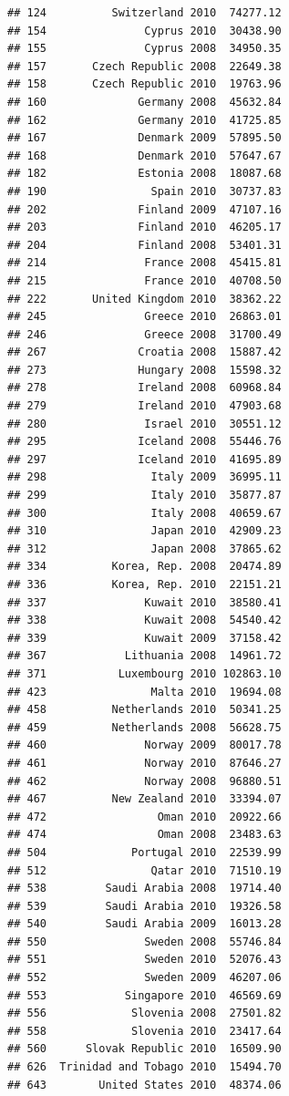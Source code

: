 \documentclass{article}\usepackage[]{graphicx}\usepackage[]{color}
\makeatletter
\newenvironment{kframe}{%
 \def\at@end@of@kframe{}%
 \ifinner\ifhmode%
  \def\at@end@of@kframe{\end{minipage}}%
  \begin{minipage}{\columnwidth}%
 \fi\fi%
 \def\FrameCommand##1{\hskip\@totalleftmargin \hskip-\fboxsep
 \colorbox{shadecolor}{##1}\hskip-\fboxsep
     \hskip-\linewidth \hskip-\@totalleftmargin \hskip\columnwidth}%
 \MakeFramed {\advance\hsize-\width
   \@totalleftmargin\z@ \linewidth\hsize
   \@setminipage}}%
 {\par\unskip\endMakeFramed%
 \at@end@of@kframe}
\newenvironment{knitrout}{}{} %
\makeatother
\begin{document}
\begin{knitrout}
\begin{kframe}
\begin{verbatim}
## 124          Switzerland 2010  74277.12
## 154               Cyprus 2010  30438.90
## 155               Cyprus 2008  34950.35
## 157       Czech Republic 2008  22649.38
## 158       Czech Republic 2010  19763.96
## 160              Germany 2008  45632.84
## 162              Germany 2010  41725.85
## 167              Denmark 2009  57895.50
## 168              Denmark 2010  57647.67
## 182              Estonia 2008  18087.68
## 190                Spain 2010  30737.83
## 202              Finland 2009  47107.16
## 203              Finland 2010  46205.17
## 204              Finland 2008  53401.31
## 214               France 2008  45415.81
## 215               France 2010  40708.50
## 222       United Kingdom 2010  38362.22
## 245               Greece 2010  26863.01
## 246               Greece 2008  31700.49
## 267              Croatia 2008  15887.42
## 273              Hungary 2008  15598.32
## 278              Ireland 2008  60968.84
## 279              Ireland 2010  47903.68
## 280               Israel 2010  30551.12
## 295              Iceland 2008  55446.76
## 297              Iceland 2010  41695.89
## 298                Italy 2009  36995.11
## 299                Italy 2010  35877.87
## 300                Italy 2008  40659.67
## 310                Japan 2010  42909.23
## 312                Japan 2008  37865.62
## 334          Korea, Rep. 2008  20474.89
## 336          Korea, Rep. 2010  22151.21
## 337               Kuwait 2010  38580.41
## 338               Kuwait 2008  54540.42
## 339               Kuwait 2009  37158.42
## 367            Lithuania 2008  14961.72
## 371           Luxembourg 2010 102863.10
## 423                Malta 2010  19694.08
## 458          Netherlands 2010  50341.25
## 459          Netherlands 2008  56628.75
## 460               Norway 2009  80017.78
## 461               Norway 2010  87646.27
## 462               Norway 2008  96880.51
## 467          New Zealand 2010  33394.07
## 472                 Oman 2010  20922.66
## 474                 Oman 2008  23483.63
## 504             Portugal 2010  22539.99
## 512                Qatar 2010  71510.19
## 538         Saudi Arabia 2008  19714.40
## 539         Saudi Arabia 2010  19326.58
## 540         Saudi Arabia 2009  16013.28
## 550               Sweden 2008  55746.84
## 551               Sweden 2010  52076.43
## 552               Sweden 2009  46207.06
## 553            Singapore 2010  46569.69
## 556             Slovenia 2008  27501.82
## 558             Slovenia 2010  23417.64
## 560      Slovak Republic 2010  16509.90
## 626  Trinidad and Tobago 2010  15494.70
## 643        United States 2010  48374.06

\end{verbatim}
\end{kframe}
\end{knitrout}
\end{document}
